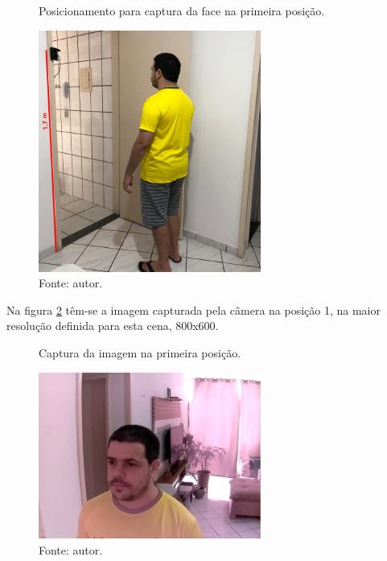 \begin{figure}[H]
    \centering
    \caption[Posicionamento para captura da face na primeira posição.]{Posicionamento para captura da face na primeira posição.}
    \includegraphics[width=0.65\textwidth]{Cap4_Experimentos_Realizados/Figures/cena2_posicao1_visao_externa.jpg}
    \caption*{Fonte: autor.}
    \label{fig:cena2_posicao1_visao_externa}
\end{figure}

Na figura \ref{fig:cena2_posicao1_imagem_capturada} têm-se a imagem capturada pela câmera na posição 1, na maior resolução definida para esta cena, 800x600.

\begin{figure}[H]
    \centering
    \caption[Captura da imagem na primeira posição.]{Captura da imagem na primeira posição.}
    \includegraphics[width=0.65\textwidth]{Cap4_Experimentos_Realizados/Figures/cena2_posicao1_imagem_capturada.jpg}
    \caption*{Fonte: autor.}
    \label{fig:cena2_posicao1_imagem_capturada}
\end{figure}

